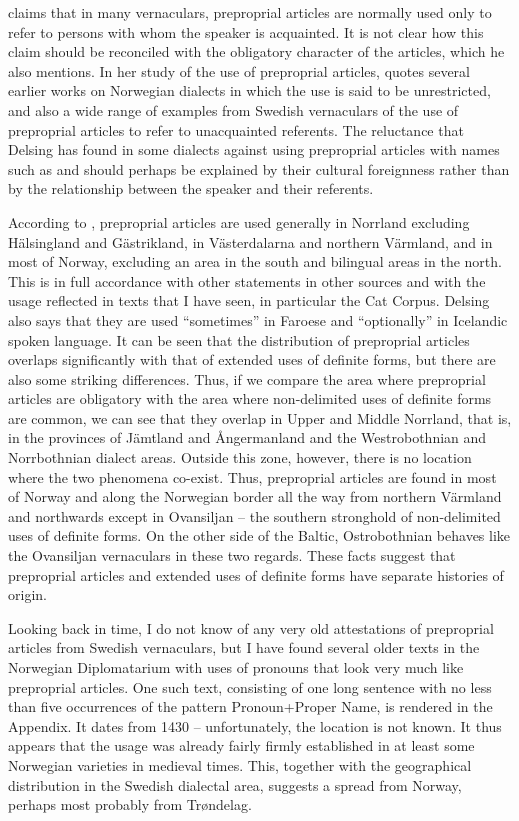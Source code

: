 \citet[21]{Delsing2003a} claims that in many vernaculars, preproprial articles are normally used only to refer to persons with whom the speaker is acquainted. It is not clear how this claim should be reconciled with the obligatory character of the articles, which he also mentions. In her study of the use of preproprial articles, \citet{Törnqvist2002} quotes several earlier works on Norwegian dialects in which the use is said to be unrestricted, and also a wide range of examples from Swedish vernaculars of the use of preproprial articles to refer to unacquainted referents. The reluctance that Delsing has found in some dialects against using preproprial articles with names such as  and  should perhaps be explained by their cultural foreignness rather than by the relationship between the speaker and their referents. 

According to \citet[21]{Delsing2003a}, preproprial articles are used generally in Norrland excluding Hälsingland and Gästrikland, in Västerdalarna and northern Värmland, and in most of Norway, excluding an area in the south and bilingual areas in the north. This is in full accordance with other statements in other sources and with the usage reflected in texts that I have seen, in particular the Cat Corpus. Delsing also says that they are used “sometimes” in Faroese and “optionally” in Icelandic spoken language. It can be seen that the distribution of preproprial articles overlaps significantly with that of extended uses of definite forms, but there are also some striking differences. Thus, if we compare the area where preproprial articles are obligatory with the area where non-delimited uses of definite forms are common, we can see that they overlap in Upper and Middle Norrland, that is, in the provinces of Jämtland and Ångermanland and the Westrobothnian and Norrbothnian dialect areas. Outside this zone, however, there is no location where the two phenomena co-exist. Thus, preproprial articles are found in most of Norway and along the Norwegian border all the way from northern Värmland and northwards except in Ovansiljan – the southern stronghold of non-delimited uses of definite forms. On the other side of the Baltic, Ostrobothnian behaves like the Ovansiljan vernaculars in these two regards. These facts suggest that preproprial articles and extended uses of definite forms have separate histories of origin.

Looking back in time, I do not know of any very old attestations of preproprial articles from Swedish vernaculars, but I have found several older texts in the Norwegian Diplomatarium with uses of pronouns that look very much like preproprial articles. One such text, consisting of one long sentence with no less than five occurrences of the pattern Pronoun+Proper Name, is rendered in the Appendix. It dates from 1430 – unfortunately, the location is not known. It thus appears that the usage was already fairly firmly established in at least some Norwegian varieties in medieval times. This, together with the geographical distribution in the Swedish dialectal area, suggests a spread from Norway, perhaps most probably from Trøndelag.

